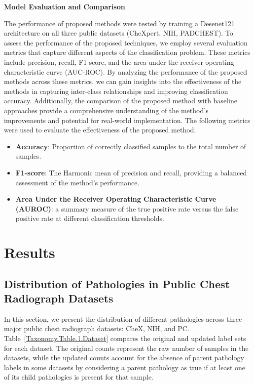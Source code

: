 \textbf{Model Evaluation and Comparison}

The performance of proposed methods were tested by training a Desenet121 architecture on all three public datasets (CheXpert, NIH, PADCHEST). To assess the performance of the proposed techniques, we employ several evaluation metrics that capture different aspects of the classification problem. These metrics include precision, recall, F1 score, and the area under the receiver operating characteristic curve (AUC-ROC). By analyzing the performance of the proposed methods across these metrics, we can gain insights into the effectiveness of the methods in capturing inter-class relationships and improving classification accuracy. Additionally, the comparison of the proposed method with baseline approaches provide a comprehensive understanding of the method's improvements and potential for real-world implementation. The following metrics were used to evaluate the effectiveness of the proposed method.

\begin{itemize}
    \item \textbf{Accuracy}: Proportion of correctly classified samples to the total number of samples.

    \item \textbf{F1-score}: The Harmonic mean of precision and recall, providing a balanced assessment of the method's performance.

    \item \textbf{Area Under the Receiver Operating Characteristic Curve (AUROC)}: a summary measure of the true positive rate versus the false positive rate at different classification thresholds.
\end{itemize}



\section{Results}

\subsection{Distribution of Pathologies in Public Chest Radiograph Datasets}

In this section, we present the distribution of different pathologies across three major public chest radiograph datasets: CheX, NIH, and PC\@. Table~\ref*{Taxonomy.Table.1.Dataset} compares the original and updated label sets for each dataset. The original counts represent the raw number of samples in the datasets, while the updated counts account for the absence of parent pathology labels in some datasets by considering a parent pathology as true if at least one of its child pathologies is present for that sample.


